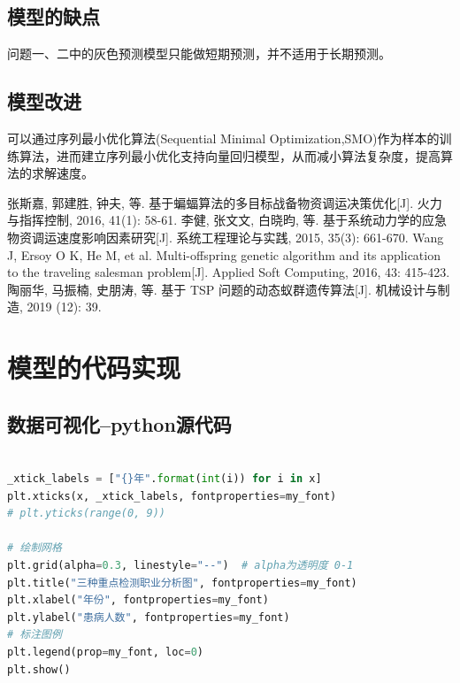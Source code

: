 \documentclass{whutmod}
\begin{document}
  \subsection{模型的缺点}
  
  问题一、二中的灰色预测模型只能做短期预测，并不适用于长期预测。
  \subsection{模型改进}
  
  可以通过序列最小优化算法(Sequential Minimal Optimization,SMO)作为样本的训练算法，进而建立序列最小优化支持向量回归模型，从而减小算法复杂度，提高算法的求解速度。
  
  
  
 
	\newpage	%
	\nocite{*}		%
%
%	
\begin{thebibliography}{9}%
	张斯嘉, 郭建胜, 钟夫, 等. 基于蝙蝠算法的多目标战备物资调运决策优化[J]. 火力与指挥控制, 2016, 41(1): 58-61.
	李健, 张文文, 白晓昀, 等. 基于系统动力学的应急物资调运速度影响因素研究[J]. 系统工程理论与实践, 2015, 35(3): 661-670.	
	Wang J, Ersoy O K, He M, et al. Multi-offspring genetic algorithm and its application to the traveling salesman problem[J]. Applied Soft Computing, 2016, 43: 415-423.
	陶丽华, 马振楠, 史朋涛, 等. 基于 TSP 问题的动态蚁群遗传算法[J]. 机械设计与制造, 2019 (12): 39.
\end{thebibliography}

	\newpage
	\appendix %

\section{模型的代码实现}

\subsection{数据可视化--python源代码}
\begin{lstlisting}[language=python]

_xtick_labels = ["{}年".format(int(i)) for i in x]
plt.xticks(x, _xtick_labels, fontproperties=my_font)
# plt.yticks(range(0, 9))

# 绘制网格
plt.grid(alpha=0.3, linestyle="--")  # alpha为透明度 0-1
plt.title("三种重点检测职业分析图", fontproperties=my_font)
plt.xlabel("年份", fontproperties=my_font)
plt.ylabel("患病人数", fontproperties=my_font)
# 标注图例
plt.legend(prop=my_font, loc=0)
plt.show()
\end{lstlisting}
\end{document}
